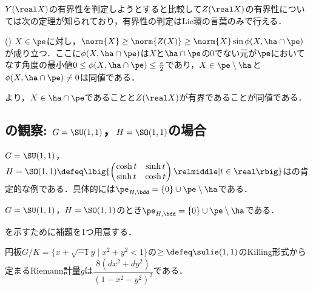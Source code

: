 $Y(\real X) $の有界性を判定しようとすると比較して$Z(\real X) $の有界性については次の定理が知られており，有界性の判定はLie環の言葉のみで行える．

\begin{thm}(\cite[Lemma~5.4]{kob97})\label{thm:kob97}
  $X\in \pe$に対し，$\norm{X}\geq \norm{Z(X)}\geq \norm{X} \sin\phi(X, \ha\cap\pe)$が成り立つ．ここに$\phi(X,\ha\cap \pe) $は$X$と$\ha\cap \pe$の0でない元が$\pe$においてなす角度の最小値${0\leq \phi(X,\ha\cap \pe) \leq \frac{\pi}{2}} $であり，$X\in \pe\setminus \ha $と$ \phi(X,\ha\cap \pe)\neq 0 $は同値である．
\end{thm}

より，$X\in \ha\cap\pe $であることと$Z(\real X) $が有界であることが同値である．


\subsection{の観察: $G = \SU(1,1) $，$H = \SO(1,1) $の場合}

$G = \SU(1,1) $，$H = \SO(1,1) \defeq\lbig\{
\begin{pmatrix}
  \cosh t & \sinh t\\ \sinh t & \cosh t
\end{pmatrix}
\relmiddle| t\in \real \rbig\} $はの肯定的な例である．具体的には$\pe_{H,\bdd} = \{0\}\cup \pe\setminus\ha $である．

\begin{prop}\label{prop:prob-eg}
  $G = \SU(1,1) $，$H = \SO(1,1) $のとき$\pe_{H,\bdd} = \{0\}\cup \pe\setminus\ha $である．
\end{prop}

を示すために補題を1つ用意する．
\begin{lem}\label{lem:riem-metric-su11}
  {\Poincare}円板${G/K =\{x+\sqrt{-1}y\mid  x^2 + y^2 < 1 \} }$の$\ge\defeq \sulie(1,1)$のKilling形式から定まるRiemann計量$g$は$ \dfrac{8(dx^2 + dy^2)}{(1 - x^2 - y^2)^2} $である．
\end{lem}

